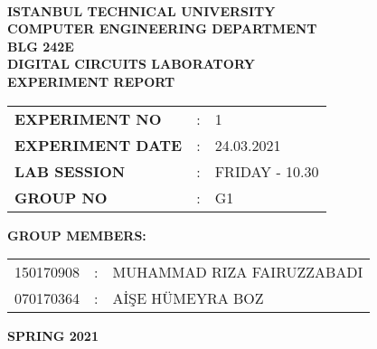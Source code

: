 \documentclass[pdftex,12pt,a4paper]{article}
\begin{document}
\begin{titlepage}
\begin{center}
\textbf{}\\
\textbf{\Large{ISTANBUL TECHNICAL UNIVERSITY}}\\
\vspace{0.5cm}
\textbf{\Large{COMPUTER ENGINEERING DEPARTMENT}}\\
\vspace{2cm}
\textbf{\Large{BLG 242E\\ DIGITAL CIRCUITS LABORATORY\\ EXPERIMENT REPORT}}\\
\vspace{2.8cm}
\begin{table}[ht]
\centering
\Large{
\begin{tabular}{lcl}
\textbf{EXPERIMENT NO}  & : & 1 \\
\textbf{EXPERIMENT DATE}  & : & 24.03.2021 \\
\textbf{LAB SESSION}  & : & FRIDAY - 10.30 \\
\textbf{GROUP NO}  & : & G1 \\
\end{tabular}}
\end{table}
\vspace{1cm}
\textbf{\Large{GROUP MEMBERS:}}\\
\begin{table}[ht]
\centering
\Large{
\begin{tabular}{rcl}
150170908  & : & MUHAMMAD RIZA FAIRUZZABADI \\
070170364  & : & AİŞE HÜMEYRA BOZ \\
\end{tabular}}
\end{table}
\vspace{2.8cm}
\textbf{\Large{SPRING 2021}}

\end{center}

\end{titlepage}

\thispagestyle{empty}
\setcounter{tocdepth}{4}
\tableofcontents
\clearpage

\setcounter{page}{1}
\end{document}
